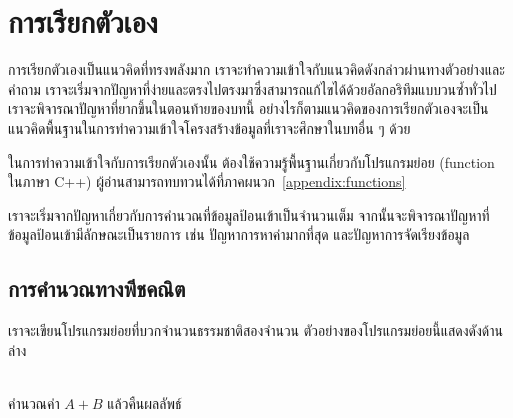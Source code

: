 \chapter{การ{\wbr}เรียก{\wbr}ตัวเอง}

การ{\wbr}เรียก{\wbr}ตัวเอง{\wbr}เป็น{\wbr}แนว{\wbr}คิด{\wbr}ที่{\wbr}ทรง{\wbr}พลัง{\wbr}มาก{\wbr}
เรา{\wbr}จะ{\wbr}ทำ{\wbr}ความ{\wbr}เข้าใจ{\wbr}กับ{\wbr}แนว{\wbr}คิด{\wbr}ดังกล่าว{\wbr}ผ่าน{\wbr}ทาง{\wbr}ตัวอย่าง{\wbr}และ{\wbr}คำถาม{\wbr}
เรา{\wbr}จะ{\wbr}เริ่ม{\wbr}จาก{\wbr}ปัญหา{\wbr}ที่{\wbr}ง่าย{\wbr}และ{\wbr}ตรงไปตรงมา{\wbr}ซึ่ง{\wbr}สามารถ{\wbr}แก้ไข{\wbr}ได้{\wbr}ด้วย{\wbr}อัล{\wbr}กอ{\wbr}ริ{\wbr}ทึม{\wbr}แบบ{\wbr}วน{\wbr}ซ้ำ{\wbr}ทั่วไป{\wbr}
เรา{\wbr}จะ{\wbr}พิจารณา{\wbr}ปัญหา{\wbr}ที่{\wbr}ยาก{\wbr}ขึ้น{\wbr}ใน{\wbr}ตอน{\wbr}ท้าย{\wbr}ของ{\wbr}บท{\wbr}นี้{\wbr}
อย่างไรก็ตาม{\wbr}แนว{\wbr}คิด{\wbr}ของ{\wbr}การ{\wbr}เรียก{\wbr}ตัวเอง{\wbr}จะ{\wbr}เป็น{\wbr}แนว{\wbr}คิด{\wbr}พื้นฐาน{\wbr}ใน{\wbr}การ{\wbr}ทำ{\wbr}ความ{\wbr}เข้าใจ{\wbr}โครงสร้าง{\wbr}ข้อมูล{\wbr}ที่{\wbr}เรา{\wbr}จะ{\wbr}ศึกษา{\wbr}ใน{\wbr}บท{\wbr}อื่น ๆ ด้วย{\wbr}

ใน{\wbr}การ{\wbr}ทำ{\wbr}ความ{\wbr}เข้าใจ{\wbr}กับ{\wbr}การ{\wbr}เรียก{\wbr}ตัวเอง{\wbr}นั้น ต้อง{\wbr}ใช้{\wbr}ความ{\wbr}รู้{\wbr}พื้นฐาน{\wbr}เกี่ยวกับ{\wbr}โปรแกรมย่อย{\wbr}
(function ใน{\wbr}ภาษา C++)
ผู้อ่าน{\wbr}สามารถ{\wbr}ทบทวน{\wbr}ได้{\wbr}ที่{\wbr}ภาคผนวก~\ref{appendix:functions}

เรา{\wbr}จะ{\wbr}เริ่ม{\wbr}จาก{\wbr}ปัญหา{\wbr}เกี่ยวกับ{\wbr}การ{\wbr}คำนวณ{\wbr}ที่{\wbr}ข้อมูล{\wbr}ป้อน{\wbr}เข้า{\wbr}เป็น{\wbr}จำนวนเต็ม{\wbr}
จากนั้น{\wbr}จะ{\wbr}พิจารณา{\wbr}ปัญหา{\wbr}ที่{\wbr}ข้อมูล{\wbr}ป้อน{\wbr}เข้า{\wbr}มี{\wbr}ลักษณะ{\wbr}เป็น{\wbr}รายการ เช่น ปัญหา{\wbr}การ{\wbr}หา{\wbr}ค่า{\wbr}มาก{\wbr}ที่สุด{\wbr}
และ{\wbr}ปัญหา{\wbr}การ{\wbr}จัดเรียง{\wbr}ข้อมูล 

\section{การ{\wbr}คำนวณ{\wbr}ทาง{\wbr}พีชคณิต}

เรา{\wbr}จะ{\wbr}เขียน{\wbr}โปรแกรมย่อย{\wbr}ที่{\wbr}บวก{\wbr}จำนวน{\wbr}ธรรมชาติ{\wbr}สอง{\wbr}จำนวน ตัวอย่าง{\wbr}ของ{\wbr}โปรแกรมย่อย{\wbr}นี้{\wbr}แสดง{\wbr}ดัง{\wbr}ด้าน{\wbr}ล่าง{\wbr}

\begin{algt}
\\
\hspace*{0.2in} คำนวณ{\wbr}ค่า $A+B$ แล้ว{\wbr}คืน{\wbr}ผลลัพธ์{\wbr}
\end{algt}


